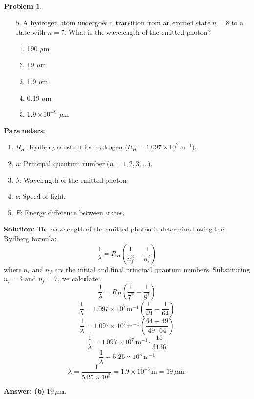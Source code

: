 \documentclass[12pt]{article}
\theoremstyle{definition} %
\newtheorem{problem}{Problem}
\theoremstyle{plain} %
\begin{document}
\begin{problem}

\noindent
\begin{enumerate}
    \item[5.] A hydrogen atom undergoes a transition from an excited state \(n = 8\) to a state with \(n = 7\). 
    What is the wavelength of the emitted photon?
    \begin{enumerate}
        \item 190 \(\mu\)m
        \item 19 \(\mu\)m
        \item 1.9 \(\mu\)m
        \item 0.19 \(\mu\)m
        \item \(1.9 \times 10^{-9}\) \(\mu\)m
    \end{enumerate}
\end{enumerate}
\textbf{Parameters:}
\begin{enumerate}
    \item \(R_H\): Rydberg constant for hydrogen (\(R_H = 1.097 \times 10^7 \, \text{m}^{-1}\)).
    \item \(n\): Principal quantum number (\(n = 1, 2, 3, \dots\)).
    \item \(\lambda\): Wavelength of the emitted photon.
    \item \(c\): Speed of light.
    \item \(E\): Energy difference between states.
\end{enumerate}
\textbf{Solution:}
The wavelength of the emitted photon is determined using the Rydberg formula:
$$
\frac{1}{\lambda} = R_H \left( \frac{1}{n_f^2} - \frac{1}{n_i^2} \right)
$$
where \(n_i\) and \(n_f\) are the initial and final principal quantum numbers. Substituting \(n_i = 8\) and \(n_f = 7\), we calculate:
$$
\frac{1}{\lambda} = R_H \left( \frac{1}{7^2} - \frac{1}{8^2} \right)
$$
$$
\frac{1}{\lambda} = 1.097 \times 10^7 \, \text{m}^{-1} \left( \frac{1}{49} - \frac{1}{64} \right)
$$
$$
\frac{1}{\lambda} = 1.097 \times 10^7 \, \text{m}^{-1} \left( \frac{64 - 49}{49 \cdot 64} \right)
$$
$$
\frac{1}{\lambda} = 1.097 \times 10^7 \, \text{m}^{-1} \cdot \frac{15}{3136}
$$
$$
\frac{1}{\lambda} = 5.25 \times 10^3 \, \text{m}^{-1}
$$
$$
\lambda = \frac{1}{5.25 \times 10^3} = 1.9 \times 10^{-6} \, \text{m} = 19 \, \mu\text{m}.
$$

\textbf{Answer:} \textbf{(b)} \(19 \, \mu\text{m}\).

\end{problem}
\end{document}
